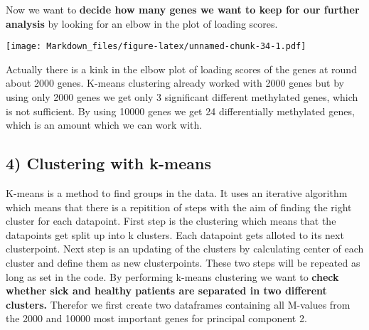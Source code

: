 \documentclass[]{article}
\newenvironment{Shaded}{\begin{snugshade}}{\end{snugshade}}
\newcommand{\KeywordTok}[1]{\textcolor[rgb]{0.13,0.29,0.53}{\textbf{#1}}}
\newcommand{\DataTypeTok}[1]{\textcolor[rgb]{0.13,0.29,0.53}{#1}}
\newcommand{\DecValTok}[1]{\textcolor[rgb]{0.00,0.00,0.81}{#1}}
\newcommand{\StringTok}[1]{\textcolor[rgb]{0.31,0.60,0.02}{#1}}
\newcommand{\OperatorTok}[1]{\textcolor[rgb]{0.81,0.36,0.00}{\textbf{#1}}}
\newcommand{\NormalTok}[1]{#1}
\begin{document}
Now we want to \textbf{decide how many genes we want to keep for our
further analysis} by looking for an elbow in the plot of loading scores.

\begin{Shaded}
\end{Shaded}

\texttt{[image: Markdown\_files/figure-latex/unnamed-chunk-34-1.pdf]}

Actually there is a kink in the elbow plot of loading scores of the
genes at round about 2000 genes. K-means clustering already worked with
2000 genes but by using only 2000 genes we get only 3 significant
different methylated genes, which is not sufficient. By using 10000
genes we get 24 differentially methylated genes, which is an amount
which we can work with.

\subsection{4) Clustering with k-means}\label{clustering-with-k-means}

K-means is a method to find groups in the data. It uses an iterative
algorithm which means that there is a repitition of steps with the aim
of finding the right cluster for each datapoint. First step is the
clustering which means that the datapoints get split up into k clusters.
Each datapoint gets alloted to its next clusterpoint. Next step is an
updating of the clusters by calculating center of each cluster and
define them as new clusterpoints. These two steps will be repeated as
long as set in the code. By performing k-means clustering we want to
\textbf{check whether sick and healthy patients are separated in two
different clusters.} Therefor we first create two dataframes containing
all M-values from the 2000 and 10000 most important genes for principal
component 2.
\end{document}
